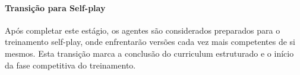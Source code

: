 




\paragraph{Transição para Self-play}

Após completar este estágio, os agentes são considerados preparados para o treinamento self-play, onde enfrentarão versões cada vez mais competentes de si mesmos. Esta transição marca a conclusão do curriculum estruturado e o início da fase competitiva do treinamento.

